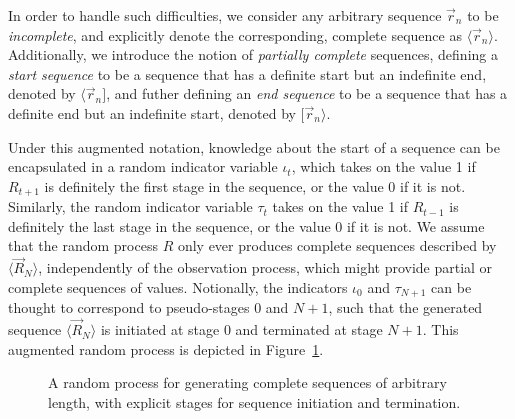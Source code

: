 \documentclass[a4paper]{article}
\begin{document}
In order to handle such difficulties, we consider any arbitrary sequence $\vec{r}_n$ to be {\em incomplete},
and explicitly denote the corresponding, complete sequence as $\langle\vec{r}_n\rangle$.
Additionally, we introduce the notion of {\em partially complete} sequences, 
defining a {\em start sequence} to be a sequence that has a definite start but an indefinite end,
denoted by $\langle\vec{r}_n]$, and futher defining an {\em end sequence} to be a sequence
that has a definite end but an indefinite start, denoted by $[\vec{r}_n\rangle$.

Under this augmented notation, knowledge about the start of a sequence can be encapsulated in 
a random indicator variable $\iota_t$, which takes on the value 1 if $R_{t+1}$ is definitely the first stage in the
sequence, or the value 0 if it is not. Similarly, the random indicator variable $\tau_{t}$
takes on the value 1 if $R_{t-1}$ is definitely the last stage in the sequence, or the value 0 if it is not.
We assume that the random process $R$ only ever produces complete sequences described by $\langle\vec{R}_N\rangle$,
independently of the observation process, which might provide partial or complete sequences of values.
Notionally, the indicators $\iota_0$ and $\tau_{N+1}$ can be thought to correspond to pseudo-stages 0 and $N+1$, such that
the generated sequence $\langle\vec{R}_N\rangle$ is initiated at stage 0 and terminated at stage $N+1$.
This augmented random process is depicted in Figure~\ref{fig:random-process}. 
\begin{figure}[hbt]
\centering
{}
\caption{A random process for generating complete sequences of arbitrary length,
with explicit stages for sequence initiation and termination.}
\label{fig:random-process}
\end{figure}
\end{document}

